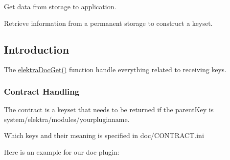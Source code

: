 Get data from storage to application. 

Retrieve information from a permanent storage to construct a keyset.\hypertarget{group__plugin_intro}{}\subsection{Introduction}\label{group__plugin_intro}
The \hyperlink{group__plugin_gacb69f3441c6d84241b4362f958fbe313}{elektra\+Doc\+Get()} function handle everything related to receiving keys.\hypertarget{group__plugin_contract}{}\subsubsection{Contract Handling}\label{group__plugin_contract}
The contract is a keyset that needs to be returned if the parent\+Key is system/elektra/modules/yourpluginname.

Which keys and their meaning is specified in doc/\+C\+O\+N\+T\+R\+A\+C\+T.\+ini

Here is an example for our doc plugin\+:


